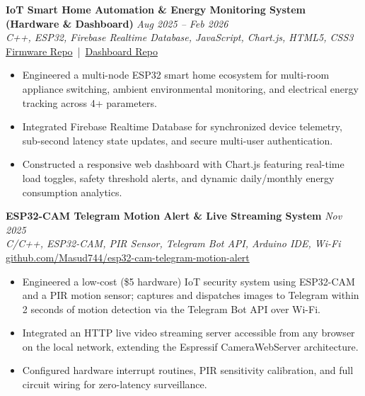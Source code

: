 \documentclass[11pt,a4paper]{article}
\begin{document}
\textbf{IoT Smart Home Automation \& Energy Monitoring System (Hardware \& Dashboard)} \hfill \textit{Aug 2025 -- Feb 2026} \\
\textit{C++, ESP32, Firebase Realtime Database, JavaScript, Chart.js, HTML5, CSS3} \\
\href{https://github.com/Masud744/IoT-Based-Home-Automation-and-Energy-Monitoring-System}{Firmware Repo} \,|\, \href{https://github.com/Masud744/Home-Automation-and-Energy-Monitoring-Dashboard}{Dashboard Repo}
\begin{itemize}
    \item Engineered a multi-node ESP32 smart home ecosystem for multi-room appliance switching, ambient environmental monitoring, and electrical energy tracking across 4+ parameters.
    \item Integrated Firebase Realtime Database for synchronized device telemetry, sub-second latency state updates, and secure multi-user authentication.
    \item Constructed a responsive web dashboard with Chart.js featuring real-time load toggles, safety threshold alerts, and dynamic daily/monthly energy consumption analytics.
\end{itemize}

\textbf{ESP32-CAM Telegram Motion Alert \& Live Streaming System} \hfill \textit{Nov 2025} \\
\textit{C/C++, ESP32-CAM, PIR Sensor, Telegram Bot API, Arduino IDE, Wi-Fi} \\
\href{https://github.com/Masud744/esp32-cam-telegram-motion-alert}{github.com/Masud744/esp32-cam-telegram-motion-alert}
\begin{itemize}
    \item Engineered a low-cost (\$5 hardware) IoT security system using ESP32-CAM and a PIR motion sensor; captures and dispatches images to Telegram within 2 seconds of motion detection via the Telegram Bot API over Wi-Fi.
    \item Integrated an HTTP live video streaming server accessible from any browser on the local network, extending the Espressif CameraWebServer architecture.
    \item Configured hardware interrupt routines, PIR sensitivity calibration, and full circuit wiring for zero-latency surveillance.
\end{itemize}
\end{document}
